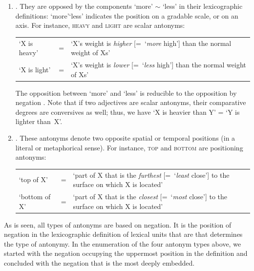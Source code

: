 \begin{enumerate}
These semantic decompositions show that `close' $\neq$ `not open' and, therefore, that \textsc{close} and \textsc{open} are not contradictory antonyms.

\item{}\label{item:scalarAntonym} . They are opposed by the components `more' $\sim$ `less' in their lexicographic definitions: `more'\slashs`less' indicates the position on a gradable scale, or on an axis. For instance, \textsc{heavy} and \textsc{light} are scalar antonyms:

\begin{tabular}{ l l p{7.5cm} }

`X is heavy' & = & `X's weight is \emph{higher} [=~`\emph{more} high'] than the normal weight of Xs' \\
`X is light' & = & `X's weight is \emph{lower} [=~`\emph{less} high'] than the normal weight of Xs' \\

\end{tabular}

The opposition between `more' and `less' is reducible to the opposition by negation \parencite[190]{Melcuk2015a-e}. Note that if two adjectives are scalar antonyms, their comparative degrees are conversives as well; thus, we have `X is heavier than Y' = `Y is lighter than~X'.

\item {}. These antonyms denote two opposite spatial or temporal positions (in a literal or metaphorical sense). For instance, \textsc{top}  and \textsc{bottom}  are positioning antonyms:

\begin{tabular}{ l l p{7.2cm} }
`top of X' & = & `part of X that is the \emph{furthest} [=~`\emph{least} close'] to the surface on which X is located' \\
`bottom of X' & = & `part of X that is the \emph{closest} [=~`\emph{most} close'] to the surface on which X is located' \\
\end{tabular}

\end{enumerate}

As is seen, all types of antonyms are based on negation. It is the position of negation in the lexicographic definition of lexical units that are  that determines the type of antonymy. In the enumeration of the four antonym types above, we started with the negation occupying the uppermost position in the definition and concluded with the negation that is the most deeply embedded.

